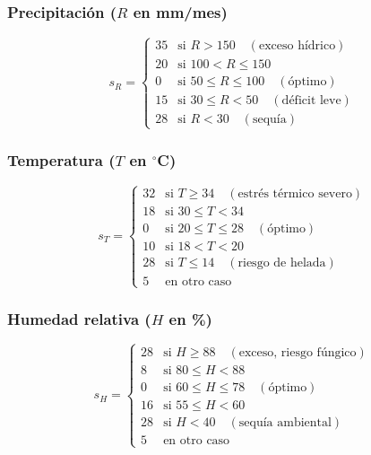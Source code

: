 \documentclass[12pt, a4paper]{article}
\begin{document}
\subsubsection*{Precipitación ($R$ en mm/mes)}
\begin{equation}
  s_R =
  \begin{cases}
    35 & \text{si } R > 150 \quad (\text{exceso hídrico}) \\
    20 & \text{si } 100 < R \leq 150 \\
    0  & \text{si } 50 \leq R \leq 100 \quad (\text{óptimo}) \\
    15 & \text{si } 30 \leq R < 50 \quad (\text{déficit leve}) \\
    28 & \text{si } R < 30 \quad (\text{sequía})
  \end{cases}
  \label{eq:score_lluvia}
\end{equation}

\subsubsection*{Temperatura ($T$ en $^\circ$C)}
\begin{equation}
  s_T =
  \begin{cases}
    32 & \text{si } T \geq 34 \quad (\text{estrés térmico severo}) \\
    18 & \text{si } 30 \leq T < 34 \\
    0  & \text{si } 20 \leq T \leq 28 \quad (\text{óptimo}) \\
    10 & \text{si } 18 < T < 20 \\
    28 & \text{si } T \leq 14 \quad (\text{riesgo de helada}) \\
    5  & \text{en otro caso}
  \end{cases}
  \label{eq:score_temp}
\end{equation}

\subsubsection*{Humedad relativa ($H$ en \%)}
\begin{equation}
  s_H =
  \begin{cases}
    28 & \text{si } H \geq 88 \quad (\text{exceso, riesgo fúngico}) \\
    8  & \text{si } 80 \leq H < 88 \\
    0  & \text{si } 60 \leq H \leq 78 \quad (\text{óptimo}) \\
    16 & \text{si } 55 \leq H < 60 \\
    28 & \text{si } H < 40 \quad (\text{sequía ambiental}) \\
    5  & \text{en otro caso}
  \end{cases}
  \label{eq:score_hum}
\end{equation}
\end{document}
